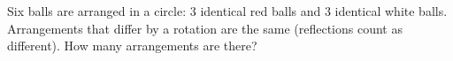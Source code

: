 Six balls are arranged in a circle: $3$ identical red balls and $3$ identical white balls. Arrangements that differ by a rotation are the same (reflections count as different). How many arrangements are there?

